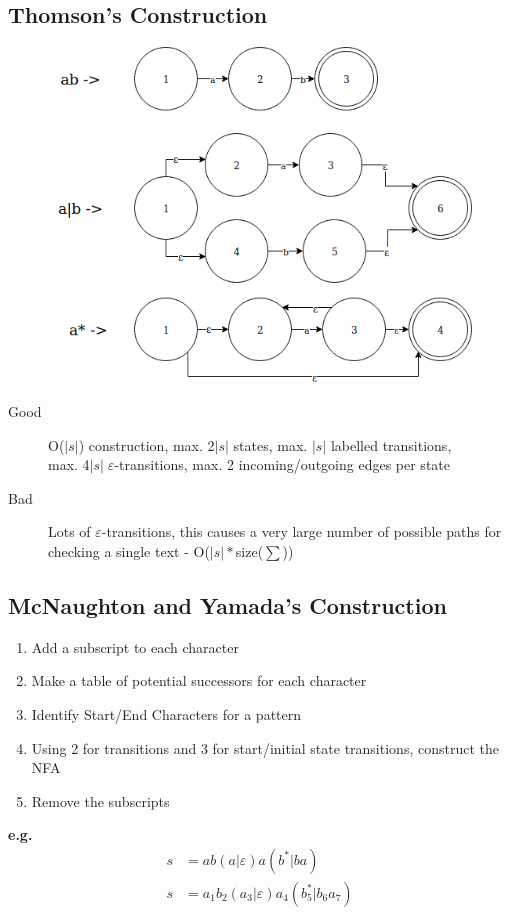 \subsection{Thomson's Construction}
\begin{figure}[H]
    \centering
    \includegraphics[width=\textwidth]{Regex/Regex1.png}
    \label{fig:Regex1}
\end{figure}
\begin{description}
    \item[Good] O($|s|$) construction, max. 2$|s|$ states, max. $|s|$ labelled transitions, \\max. 4$|s|\; \varepsilon$-transitions, max. 2 incoming/outgoing edges per state
    \item[Bad] Lots of $\varepsilon$-transitions, this causes a very large number of possible paths for checking a single text - O($|s|*$size($\sum$))
\end{description}

\newpage
\subsection{McNaughton and Yamada's Construction}
\begin{enumerate}
    \item Add a subscript to each character
    \item Make a table of potential successors for each character
    \item Identify Start/End Characters for a pattern
    \item Using 2 for transitions and 3 for start/initial state transitions, construct the NFA
    \item Remove the subscripts
\end{enumerate}
\textbf{e.g.}
\begin{align}
    s &= ab(a|\varepsilon)a(b^*|ba) \nonumber \\
    s &= a_1b_2(a_3|\varepsilon)a_4(b^*_5|b_6a_7) \nonumber 
\end{align}

